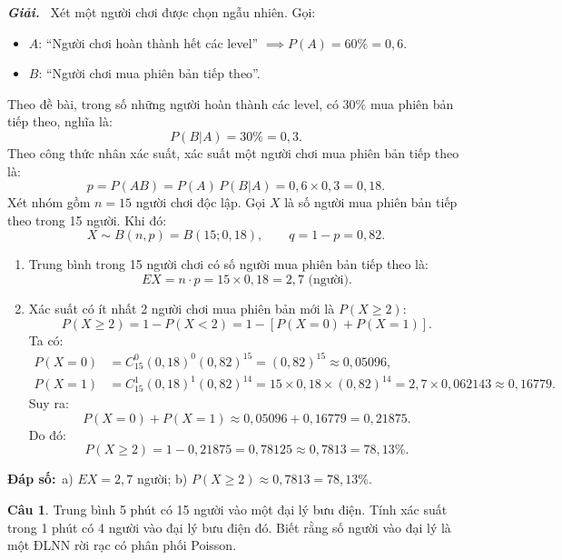 \documentclass[12pt,a4paper]{article}
\theoremstyle{definition}
\newtheorem{cau}{Câu}
\newcommand{\giai}{\noindent\textbf{\textit{Giải.}}\ }
\newcommand{\dapso}[1]{\noindent\textbf{Đáp số:}\ #1}
\begin{document}
\giai
Xét một người chơi được chọn ngẫu nhiên. Gọi:
\begin{itemize}
    \item $A$: ``Người chơi hoàn thành hết các level'' $\implies P(A) = 60\% = 0{,}6$.
    \item $B$: ``Người chơi mua phiên bản tiếp theo''.
\end{itemize}
Theo đề bài, trong số những người hoàn thành các level, có $30\%$ mua phiên bản tiếp theo, nghĩa là:
\[
P(B|A) = 30\% = 0{,}3.
\]
Theo công thức nhân xác suất, xác suất một người chơi mua phiên bản tiếp theo là:
\[
p = P(AB) = P(A)\,P(B|A) = 0{,}6 \times 0{,}3 = 0{,}18.
\]
Xét nhóm gồm $n = 15$ người chơi độc lập. Gọi $X$ là số người mua phiên bản tiếp theo trong 15 người. Khi đó:
\[
X \sim B(n, p) = B(15; 0{,}18), \qquad q = 1 - p = 0{,}82.
\]

\begin{enumerate}[label=\alph*)]
    \item Trung bình trong 15 người chơi có số người mua phiên bản tiếp theo là:
    \[
    EX = n \cdot p = 15 \times 0{,}18 = 2{,}7\text{ (người)}.
    \]

    \item Xác suất có ít nhất 2 người chơi mua phiên bản mới là $P(X \ge 2)$:
    \[
    P(X \ge 2) = 1 - P(X < 2) = 1 - [P(X = 0) + P(X = 1)].
    \]
    Ta có:
    \begin{align*}
    P(X = 0) &= C_{15}^0 (0{,}18)^0 (0{,}82)^{15} = (0{,}82)^{15} \approx 0{,}05096, \\
    P(X = 1) &= C_{15}^1 (0{,}18)^1 (0{,}82)^{14} = 15 \times 0{,}18 \times (0{,}82)^{14} = 2{,}7 \times 0{,}062143 \approx 0{,}16779.
    \end{align*}
    Suy ra:
    \[
    P(X = 0) + P(X = 1) \approx 0{,}05096 + 0{,}16779 = 0{,}21875.
    \]
    Do đó:
    \[
    P(X \ge 2) = 1 - 0{,}21875 = 0{,}78125 \approx 0{,}7813 = 78{,}13\%.
    \]
\end{enumerate}

\dapso{a) $EX = 2{,}7$ người; \quad b) $P(X \ge 2) \approx 0{,}7813 = 78{,}13\%$.}

\vspace{1.5em}
\begin{cau}
Trung bình 5 phút có 15 người vào một đại lý bưu điện. Tính xác suất trong 1 phút có 4 người vào đại lý bưu điện đó. Biết rằng số người vào đại lý là một ĐLNN rời rạc có phân phối Poisson.
\end{cau}
\end{document}
